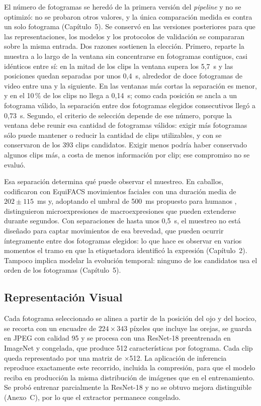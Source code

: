 El número de \Fotogramas{} fotogramas se heredó de la primera versión del \textit{pipeline} y no se optimizó: no se probaron otros valores, y la única comparación medida es contra un solo fotograma (Capítulo~5). Se conservó en las versiones posteriores para que las representaciones, los modelos y los protocolos de validación se compararan sobre la misma entrada. Dos razones sostienen la elección. Primero, reparte la muestra a lo largo de la ventana sin concentrarse en fotogramas contiguos, casi idénticos entre sí: en la mitad de los clips la ventana supera los 5,7~s y las posiciones quedan separadas por unos 0,4~s, alrededor de doce fotogramas de video entre una y la siguiente. En las ventanas más cortas la separación es menor, y en el 10\,\% de los clips no llega a 0,14~s; como cada posición se ancla a un fotograma válido, la separación entre dos fotogramas elegidos consecutivos llegó a 0,73~s. Segundo, el criterio de selección depende de ese número, porque la ventana debe reunir esa cantidad de fotogramas válidos: exigir más fotogramas sólo puede mantener o reducir la cantidad de clips utilizables, y con \Fotogramas{} se conservaron \ClipsTotal{} de los 393 clips candidatos. Exigir menos podría haber conservado algunos clips más, a costa de menos información por clip; ese compromiso no se evaluó.

Esa separación determina qué puede observar el muestreo. En caballos, \textcite{tomberg2023} codificaron con EquiFACS movimientos faciales con una duración media de $202 \pm 115$~ms y, adoptando el umbral de 500~ms propuesto para humanos \parencite{yan2013}, distinguieron microexpresiones de macroexpresiones que pueden extenderse durante segundos. Con separaciones de hasta unos 0,5~s, el muestreo no está diseñado para captar movimientos de esa brevedad, que pueden ocurrir íntegramente entre dos fotogramas elegidos: lo que hace es observar en varios momentos el tramo en que la etiquetadora identificó la expresión (Capítulo~2). Tampoco implica modelar la evolución temporal: ninguno de los candidatos usa el orden de los fotogramas (Capítulo~5).

\subsection{Representación Visual}
Cada fotograma seleccionado se alinea a partir de la posición del ojo y del hocico, se recorta con un encuadre de $224 \times 343$ píxeles que incluye las orejas, se guarda en JPEG con calidad 95 y se procesa con una ResNet-18 \parencite{he2016} preentrenada en ImageNet \parencite{deng2009} y congelada, que produce 512 características por fotograma. Cada clip queda representado por una matriz de \Fotogramas{}$\times$512. La aplicación de inferencia reproduce exactamente este recorrido, incluida la compresión, para que el modelo reciba en producción la misma distribución de imágenes que en el entrenamiento. Se probó entrenar parcialmente la ResNet-18 y no se obtuvo mejora distinguible (Anexo~C), por lo que el extractor permanece congelado.

